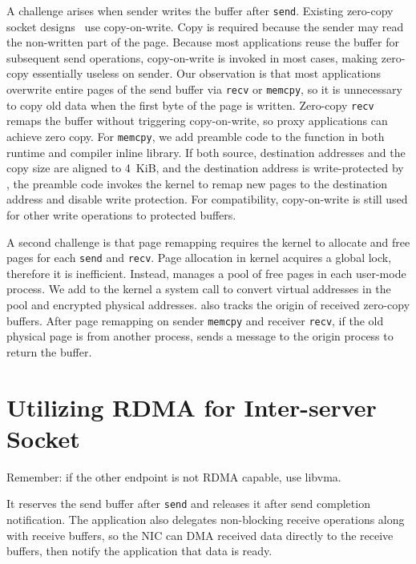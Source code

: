 A challenge arises when sender writes the buffer after \texttt{send}.
Existing zero-copy socket designs~\cite{thadani1995efficient,chu1996zero} use copy-on-write. Copy is required because the sender may read the non-written part of the page.
Because most applications reuse the buffer for subsequent send operations, copy-on-write is invoked in most cases, making zero-copy essentially useless on sender.
Our observation is that most applications overwrite entire pages of the send buffer via \texttt{recv} or \texttt{memcpy}, so it is unnecessary to copy old data when the first byte of the page is written.
Zero-copy \texttt{recv} remaps the buffer without triggering copy-on-write, so proxy applications can achieve zero copy.
For \texttt{memcpy}, we add preamble code to the function in both \libipc{} runtime and compiler inline library. If both source, destination addresses and the copy size are aligned to 4~KiB, and the destination address is write-protected by \libipc{}, the preamble code invokes the kernel to remap new pages to the destination address and disable write protection.
For compatibility, copy-on-write is still used for other write operations to protected buffers.

A second challenge is that page remapping requires the kernel to allocate and free pages for each \texttt{send} and \texttt{recv}. Page allocation in kernel acquires a global lock, therefore it is inefficient. Instead, \libipc{} manages a pool of free pages in each user-mode process.
We add to the kernel a system call to convert virtual addresses in the pool and encrypted physical addresses.
\libipc{} also tracks the origin of received zero-copy buffers.
After page remapping on sender \texttt{memcpy} and receiver \texttt{recv}, if the old physical page is from another process, \libipc{} sends a message to the origin process to return the buffer.


\section{Utilizing RDMA for Inter-server Socket}
\label{sec:rdma}

Remember: if the other endpoint is not RDMA capable, use libvma.

 It reserves the send buffer after \texttt{send} and releases it after send completion notification.
The application also delegates non-blocking receive operations along with receive buffers, so the NIC can DMA received data directly to the receive buffers, then notify the application that data is ready.